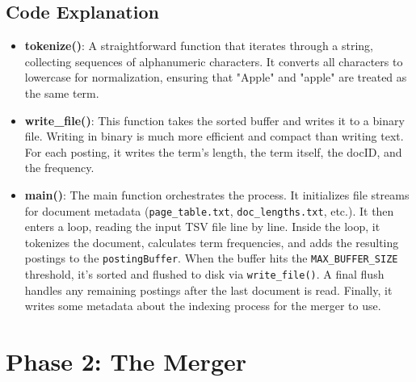 \documentclass{article}
\begin{document}
\subsection{Code Explanation}
\begin{itemize}
    \item \textbf{tokenize()}: A straightforward function that iterates through a string, collecting sequences of alphanumeric characters. It converts all characters to lowercase for normalization, ensuring that "Apple" and "apple" are treated as the same term.
    \item \textbf{write\_file()}: This function takes the sorted buffer and writes it to a binary file. Writing in binary is much more efficient and compact than writing text. For each posting, it writes the term's length, the term itself, the docID, and the frequency.
    \item \textbf{main()}: The main function orchestrates the process. It initializes file streams for document metadata (\texttt{page\_table.txt}, \texttt{doc\_lengths.txt}, etc.). It then enters a loop, reading the input TSV file line by line. Inside the loop, it tokenizes the document, calculates term frequencies, and adds the resulting postings to the \texttt{postingBuffer}. When the buffer hits the \texttt{MAX\_BUFFER\_SIZE} threshold, it's sorted and flushed to disk via \texttt{write\_file()}. A final flush handles any remaining postings after the last document is read. Finally, it writes some metadata about the indexing process for the merger to use.
\end{itemize}

\section{Phase 2: The Merger}
\end{document}
